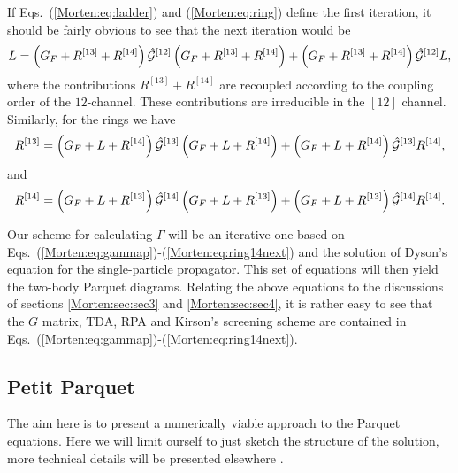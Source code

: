 If Eqs.~(\ref{Morten:eq:ladder}) and (\ref{Morten:eq:ring}) define the first iteration,
it should be fairly obvious to see that the next iteration would be
\begin{equation}
    L=\left(G_F+R^{[13]}+R^{[14]}\right)\hat{{\cal G}}^{[12]}\left(G_F+R^{[13]}+R^{[14]}\right)
      +\left(G_F+R^{[13]}+R^{[14]}\right)\hat{{\cal G}}^{[12]}L,
    \label{Morten:eq:laddernext}
\end{equation}
where the contributions $R^{[13]}+R^{[14]} $ are recoupled according to the coupling order
of the $12$-channel. These contributions are irreducible in the $[12]$ channel.
Similarly, for the rings we have
\begin{equation}
    R^{[13]}=\left(G_F+L+R^{[14]}\right)\hat{{\cal G}}^{[13]}
             \left(G_F+L+R^{[14]}\right) + 
             \left(G_F+L+R^{[14]}\right)\hat{{\cal G}}^{[13]}R^{[14]},
    \label{Morten:eq:ring13next}
\end{equation}
and
\begin{equation}
    R^{[14]}=\left(G_F+L+R^{[13]}\right)\hat{{\cal G}}^{[14]}
             \left(G_F+L+R^{[13]}\right) + 
             \left(G_F+L+R^{[13]}\right)\hat{{\cal G}}^{[14]}R^{[14]}.
    \label{Morten:eq:ring14next}
\end{equation}


Our scheme for calculating $\Gamma$ will be an iterative one based on 
Eqs.~(\ref{Morten:eq:gammap})-(\ref{Morten:eq:ring14next}) 
and the solution of Dyson's equation
for the single-particle propagator. This set of equations will then yield
the two-body Parquet diagrams. 
Relating the above equations to the discussions of sections \ref{Morten:sec:sec3}
and \ref{Morten:sec:sec4}, it is rather easy to see 
that the $G$ matrix, TDA, RPA and Kirson's
screening scheme are contained in 
Eqs.~(\ref{Morten:eq:gammap})-(\ref{Morten:eq:ring14next}).



\subsection{Petit Parquet}

The aim here is to present a numerically viable approach
to the Parquet equations.
Here
we will limit ourself to just sketch 
the structure of the solution, more technical details 
will be presented elsewhere \cite{Morten:mhj99}.

